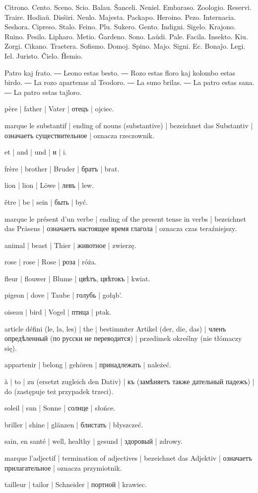 Citrono. Cento. Sceno. Scio. Balau. Ŝanceli. Neniel. Embaraso. Zoologio. Reservi. Traire. Hodiaŭ. Disŝiri. Neulo. Majesta. Packapo. Heroino. Pezo. Internacia. Seshora. Cipreso. Stalo. Feino. Plu. Sukero. Gento. Indigni. Sigelo. Krajono. Ruino. Pesilo. Lipharo. Metio. Ĝardeno. Sono. Laŭdi. Pale. Facila. Insekto. Kiu. Zorgi. Cikano. Traetera. Sofismo. Domoj. Spino. Majo. Signi. Ec. Bonaĵo. Legi. Iel. Juristo. Ĉielo. Ĥemio.


Patro kaj frato. ― Leono estas besto. ― Rozo estas floro kaj kolombo estas birdo. ― La rozo apartenas al Teodoro. ― La suno brilas. ― La patro estas sana. ― La patro estas tajloro.

\begin{ekzvocab}{1em}
 père | father | Vater | отецъ | ojciec.

 marque le substantif | ending of nouns (substantive) | bezeichnet das Substantiv | означаетъ существительное | oznacza rzeczownik.

 et | and | und | и | i.

 frère | brother | Bruder | братъ | brat.

 lion | lion | Löwe | левъ | lew.

 être | be | sein | быть | być.

 marque le présent d’un verbe | ending of the present tense in verbs | bezeichnet das Präsens | означаетъ настоящее время глагола | oznacza czas teraźniejszy.

 animal | beast | Thier | животное | zwierzę.

 rose | rose | Rose | роза | róża.

 fleur | flouwer | Blume | цвѣтъ, цвѣтокъ | kwiat.

 pigeon | dove | Taube | голубь | gołąb’.

 oiseau | bird | Vogel | птица | ptak.

 article défini (le, la, les) | the | bestimmter Artikel (der, die, das) | членъ опредѣленный (по русски не переводится) | przedimek określny (nie tłómaczy się).

 appartenir | belong | gehören | принадлежать | należeć.

 à | to | zu (ersetzt zugleich den Dativ) | къ (замѣняетъ также дательный падежъ) | do (zastępuje też przypadek trzeci).

 soleil | sun | Sonne | солнце | słońce.

 briller | shine | glänzen | блистать | błyszczeć.

 sain, en santé | well, healthy | gesund | здоровый | zdrowy.

 marque l’adjectif | termination of adjectives | bezeichnet das Adjektiv | означаетъ прилагательное | oznacza przymiotnik.

 tailleur | tailor | Schneider | портной | krawiec.

\end{ekzvocab}


